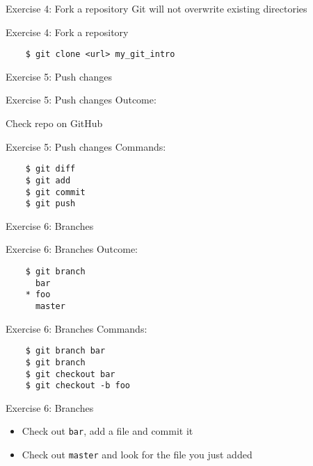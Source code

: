 \documentclass{beamer}
\begin{document}
\begin{frame}{Exercise 4: Fork a repository}
  \center
  \Huge Git will not overwrite existing directories
\end{frame}

\begin{frame}[fragile]{Exercise 4: Fork a repository}
  \center
  \begin{verbatim}
    $ git clone <url> my_git_intro
  \end{verbatim}
\end{frame}

\begin{frame}{}
  \center
  \Huge Exercise 5: Push changes
\end{frame}

\begin{frame}{Exercise 5: Push changes}
  Outcome:

  Check repo on GitHub
\end{frame}

\begin{frame}[fragile]{Exercise 5: Push changes}
  Commands:

  \begin{verbatim}
    $ git diff
    $ git add
    $ git commit
    $ git push
  \end{verbatim}
\end{frame}

\begin{frame}{}
  \center
  \Huge Exercise 6: Branches
\end{frame}

\begin{frame}[fragile]{Exercise 6: Branches}
  Outcome:

  \begin{verbatim}
    $ git branch
      bar
    * foo
      master
  \end{verbatim}
\end{frame}

\begin{frame}[fragile]{Exercise 6: Branches}
  Commands:

  \begin{verbatim}
    $ git branch bar
    $ git branch
    $ git checkout bar
    $ git checkout -b foo
  \end{verbatim}
\end{frame}

\begin{frame}{Exercise 6: Branches}
  \begin{itemize}
    \item \Large Check out \texttt{bar}, add a file and commit it
    \item \Large Check out \texttt{master} and look for the file you just added
  \end{itemize}
\end{frame}
\end{document}
